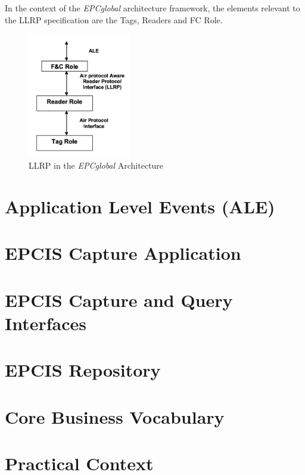 In the context of the \emph{EPCglobal} architecture framework, the elements relevant to the LLRP specification are the Tags, Readers and \gls{FC} Role.

\begin{figure}[!ht]
    \centering
    \includegraphics[width=0.4\textwidth]{./assets/02-state-of-the-art/llrp-interaction}
    \caption{\gls{LLRP} in the \emph{EPCglobal} Architecture~\cite{Llrp1standard20101013Pdf}} 
    \label{fig:02:llrp-interaction}
\end{figure}


\section{Application Level Events (ALE)}

\section{EPCIS Capture Application}

\section{EPCIS Capture and Query Interfaces}

\section{EPCIS Repository}

\section{Core Business Vocabulary}

\section{Practical Context}

